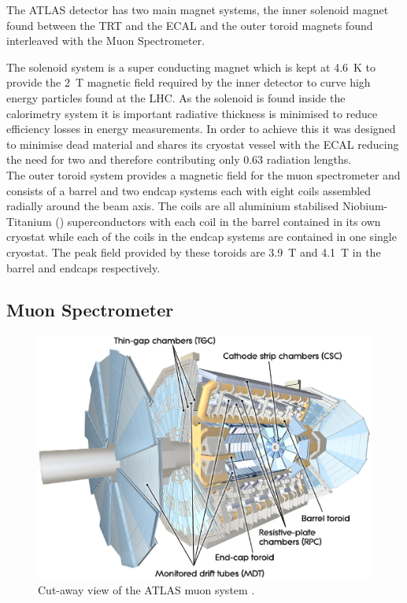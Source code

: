		The ATLAS detector has two main magnet systems, the inner solenoid magnet found between the TRT and the ECAL and the outer toroid magnets found interleaved with the Muon Spectrometer. 

		The solenoid system is a super conducting magnet which is kept at \SI{4.6}{\K} to provide the \SI{2}{T} magnetic field required by the inner detector to curve high energy particles found at the LHC. As the solenoid is found inside the calorimetry system it is important radiative thickness is minimised to reduce efficiency losses in energy measurements. In order to achieve this it was designed to minimise dead material and shares its cryostat vessel with the ECAL reducing the need for two and therefore contributing only 0.63 radiation lengths.\\ 

		The outer toroid system provides a magnetic field for the muon spectrometer and consists of a barrel and two endcap systems each with eight coils assembled radially around the beam axis. The coils are all aluminium stabilised Niobium-Titanium () superconductors with each coil in the barrel contained in its own cryostat while each of the coils in the endcap systems are contained in one single cryostat. The peak field provided by these toroids are \SI{3.9}{T} and \SI{4.1}{T} in the barrel and endcaps respectively.\\

	


	\subsection{Muon Spectrometer}

		\begin{figure}[h]
			\begin{center}
				\includegraphics[scale=0.4]{images/MuonSystem_d3.eps}
			\end{center}
			\caption{ Cut-away view of the ATLAS muon system \cite{Aad:1129811}.}
			\label{fig:ATLAS_muon}
		\end{figure}


